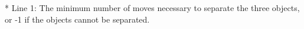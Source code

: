* Line 1: The minimum number of moves necessary to separate the three objects, or -1 if the objects cannot be separated.